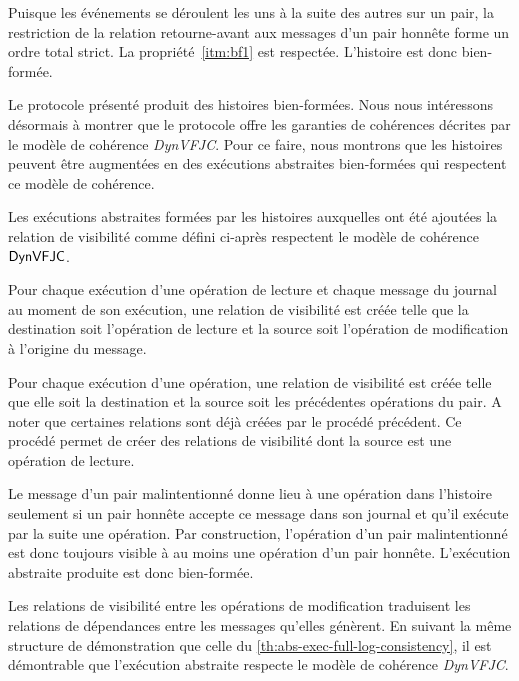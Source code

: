 Puisque les événements se déroulent les uns à la suite des autres sur un pair, la restriction de la relation retourne-avant aux messages d'un pair honnête forme un ordre total strict.
La propriété~\ref{itm:bf1} est respectée.
L'histoire est donc bien-formée.

Le protocole présenté produit des histoires bien-formées.
Nous nous intéressons désormais à montrer que le protocole offre les garanties de cohérences décrites par le modèle de cohérence \emph{DynVFJC}.
Pour ce faire, nous montrons que les histoires peuvent être augmentées en des exécutions abstraites bien-formées qui respectent ce modèle de cohérence.

Les exécutions abstraites formées par les histoires auxquelles ont été ajoutées la relation de visibilité comme défini ci-après respectent le modèle de cohérence $\operatorname{\mathsf{DynVFJC}}$.

Pour chaque exécution d'une opération de lecture et chaque message du journal au moment de son exécution, une relation de visibilité est créée telle que la destination soit l'opération de lecture et la source soit l'opération de modification à l'origine du message.

Pour chaque exécution d'une opération, une relation de visibilité est créée telle que elle soit la destination et la source soit les précédentes opérations du pair.
A noter que certaines relations sont déjà créées par le procédé précédent.
Ce procédé permet de créer des relations de visibilité dont la source est une opération de lecture. 

Le message d'un pair malintentionné donne lieu à une opération dans l'histoire seulement si un pair honnête accepte ce message dans son journal et qu'il exécute par la suite une opération.
Par construction, l'opération d'un pair malintentionné est donc toujours visible à au moins une opération d'un pair honnête.
L'exécution abstraite produite est donc bien-formée.

Les relations de visibilité entre les opérations de modification traduisent les relations de dépendances entre les messages qu'elles génèrent.
En suivant la même structure de démonstration que celle du \autoref{th:abs-exec-full-log-consistency}, il est démontrable que l'exécution abstraite respecte le modèle de cohérence \emph{DynVFJC}.

